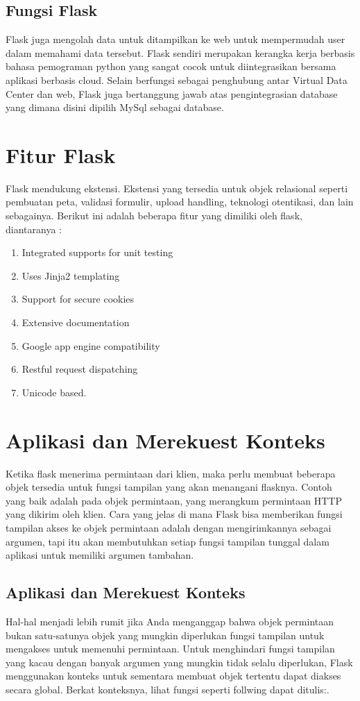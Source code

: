 \subsection{Fungsi Flask}
Flask juga mengolah data untuk ditampilkan ke web untuk mempermudah user dalam memahami data tersebut. Flask sendiri merupakan kerangka kerja berbasis bahasa pemograman python yang sangat cocok untuk diintegrasikan bersama aplikasi berbasis cloud. Selain berfungsi sebagai penghubung antar Virtual Data Center dan web, Flask juga bertanggung jawab atas pengintegrasian database yang dimana disini dipilih MySql sebagai database\cite{alauddin2017implementasi}.


\section{Fitur Flask}
Flask mendukung ekstensi. Ekstensi yang tersedia untuk objek relasional seperti pembuatan peta,
validasi formulir, upload handling, teknologi otentikasi, dan lain sebagainya. Berikut ini adalah beberapa
fitur yang dimiliki oleh flask, diantaranya :
\begin{enumerate}
  \item Integrated supports for unit testing
  \item Uses Jinja2 templating
  \item Support for secure cookies
  \item Extensive documentation
  \item Google app engine compatibility
  \item Restful request dispatching
  \item Unicode based\cite{lokhande2015efficient}.
\end{enumerate}

\section{Aplikasi dan Merekuest Konteks}
Ketika flask menerima permintaan dari klien, maka perlu membuat beberapa objek tersedia untuk fungsi tampilan yang akan menangani flasknya. Contoh yang baik adalah pada objek permintaan, yang merangkum permintaan HTTP yang dikirim oleh klien. Cara yang jelas di mana Flask bisa memberikan fungsi tampilan akses ke objek permintaan adalah dengan mengirimkannya sebagai argumen, tapi itu akan membutuhkan setiap fungsi tampilan tunggal dalam aplikasi untuk memiliki argumen tambahan\cite{grinberg2018flask}.

\subsection{Aplikasi dan Merekuest Konteks}
Hal-hal menjadi lebih rumit jika Anda menganggap bahwa objek permintaan bukan satu-satunya objek yang mungkin diperlukan fungsi tampilan untuk mengakses untuk memenuhi permintaan. Untuk menghindari fungsi tampilan yang kacau dengan banyak argumen yang mungkin tidak selalu diperlukan, Flask menggunakan konteks untuk sementara membuat objek tertentu dapat diakses secara global. Berkat konteksnya, lihat fungsi seperti follwing dapat ditulis:\cite{grinberg2018flask}.


